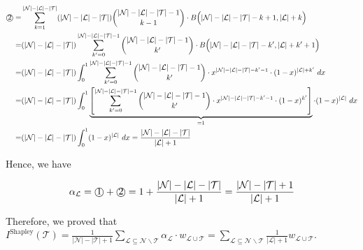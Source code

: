 \begin{small}
\begin{align*}
\text{\textcircled{2}} =& \sum_{k=1}^{|\mathcal{N}|-|\mathcal{L}|-|\mathcal{T}|} (|\mathcal{N}|-|\mathcal{L}|-|\mathcal{T}|)\binom{|\mathcal{N}|-|\mathcal{L}|-|\mathcal{T}|-1}{k-1}\cdot B\Big(|\mathcal{N}|-|\mathcal{L}|-|\mathcal{T}|-k+1, |\mathcal{L}|+k\Big)\\
=& (|\mathcal{N}|-|\mathcal{L}|-|\mathcal{T}|)\sum_{k'=0}^{|\mathcal{N}|-|\mathcal{L}|-|\mathcal{T}|-1}\binom{|\mathcal{N}|-|\mathcal{L}|-|\mathcal{T}|-1}{k'}\cdot B\Big(|\mathcal{N}|-|\mathcal{L}|-|\mathcal{T}|-k',|\mathcal{L}|+k'+1\Big)\\
=&  (|\mathcal{N}|-|\mathcal{L}|-|\mathcal{T}|) \int_0^1 \sum_{k'=0}^{|\mathcal{N}|-|\mathcal{L}|-|\mathcal{T}|-1}\binom{|\mathcal{N}|-|\mathcal{L}|-|\mathcal{T}|-1}{k'}\cdot x^{|\mathcal{N}|-|\mathcal{L}|-|\mathcal{T}|-k'-1}\cdot (1-x)^{|\mathcal{L}|+k'}\ dx\\
=& (|\mathcal{N}|-|\mathcal{L}|-|\mathcal{T}|) \int_0^1 \underbrace{\left[\sum_{k'=0}^{|\mathcal{N}|-|\mathcal{L}|-|\mathcal{T}|-1}\binom{|\mathcal{N}|-|\mathcal{L}|-|\mathcal{T}|-1}{k'}\cdot x^{|\mathcal{N}|-|\mathcal{L}|-|\mathcal{T}|-k'-1}\cdot (1-x)^{k'}\right]}_{=1}\cdot (1-x)^{|\mathcal{L}|}\ dx\\
=& (|\mathcal{N}|-|\mathcal{L}|-|\mathcal{T}|) \int_0^1 (1-x)^{|\mathcal{L}|}\ dx = \frac{|\mathcal{N}|-|\mathcal{L}|-|\mathcal{T}|}{|\mathcal{L}|+1}
\end{align*}
\end{small}

Hence, we have


\begin{small}
\begin{equation*}
\begin{aligned}
\alpha_\mathcal{L}=\text{\textcircled{1}}+\text{\textcircled{2}}=1+\frac{|\mathcal{N}|-|\mathcal{L}|-|\mathcal{T}|}{|\mathcal{L}|+1}=\frac{|\mathcal{N}|-|\mathcal{T}|+1}{|\mathcal{L}|+1}
\end{aligned}
\end{equation*}
\end{small}

Therefore, we proved that {\small$I^{\textrm{Shapley}}(\mathcal{T})=\frac{1}{|\mathcal{N}|-|\mathcal{T}|+1}\sum_{\mathcal{L}\subseteq \mathcal{N}\backslash \mathcal{T}}\alpha_\mathcal{L}\cdot  w_{\mathcal{L}\cup \mathcal{T}} =\sum_{\mathcal{L}\subseteq \mathcal{N}\backslash \mathcal{T}}\frac{1}{|\mathcal{L}|+1} w_{\mathcal{L}\cup \mathcal{T}}$}.




